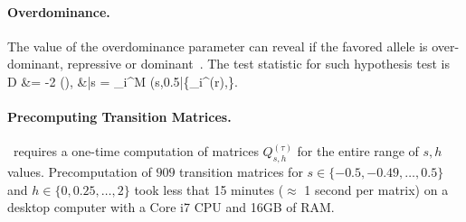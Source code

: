 \paragraph{Overdominance.}
\label{sec:regression}
 The value of the overdominance 
 parameter can
reveal if the favored allele
is over-dominant, repressive or dominant~\cite{gillespie2010population}. The 
test statistic for 
 such hypothesis test is
\beq
D &= -2 \log 
\left(\right),
&\bar{s} =  \prod_i^M 
\Lc(s,0.5|\{_i^{(r)},\hN\}.
\eeq
{}


\paragraph{Precomputing Transition Matrices.}
\comale\ requires a one-time computation of matrices
$Q^{(\tau)}_{s,h}$ for the entire range of $s,h$
values. Precomputation of $909$ transition matrices for
$s\in\{-0.5,-0.49,\ldots,0.5 \}$ and $h\in \{0,0.25,\ldots,2\}$ took
less that 15 minutes ($\approx$ 1 second per matrix) on a desktop
computer with a Core i7 CPU and 16GB of RAM.

